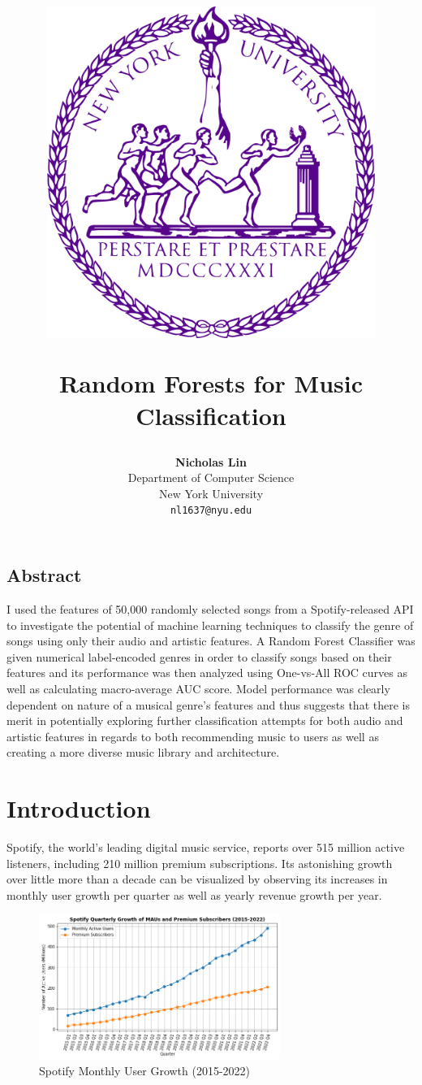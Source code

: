 \documentclass[12pt]{article}
\title{\vspace{-2cm}
\begin{center}
\begin{minipage}{.1\textwidth}
\includegraphics[width=0.8\textwidth]{nyu_seal.png} 
\end{minipage}
\begin{minipage}{.34\textwidth}
\textt{CSCI-UA 473}
\end{minipage}
\end{center}
\vspace{1cm}
\textbf{Random Forests for Music Classification}
\vspace{1cm}}
\author{\textbf{Nicholas Lin}
\\
Department of Computer Science\\
New York University\\
\texttt{nl1637@nyu.edu}}
\date{}
\begin{document}
\maketitle

\begin{center}
    \vspace{1cm}
    \section*{\textbf{Abstract}}
\end{center}

\begin{center}
\end{center}
\vspace{-0.85cm}
I used the features of 50,000 randomly selected songs from a Spotify-released API to investigate the potential of machine learning techniques to classify the genre of songs using only their audio and artistic features. A Random Forest Classifier was given numerical label-encoded genres in order to classify songs based on their features and its performance was then analyzed using One-vs-All ROC curves as well as calculating macro-average AUC score. Model performance was clearly dependent on nature of a musical genre's features and thus suggests that there is merit in potentially exploring further classification attempts for both audio and artistic features in regards to both recommending music to users as well as creating a more diverse music library and architecture.


\newpage

\section{\textbf{Introduction}}
Spotify, the world's leading digital music service, reports over 515 million active listeners, including 210 million premium subscriptions. Its astonishing growth over little more than a decade can be visualized by observing its increases in monthly user growth per quarter as well as yearly revenue growth per year.
\begin{figure}[htbp]
  \centering
  \includegraphics[width=0.7\textwidth]{spotify_growth.png}
  \caption{Spotify Monthly User Growth (2015-2022)}
  \label{Spotify Growth (2015-2022}
\end{figure}
\end{document}
